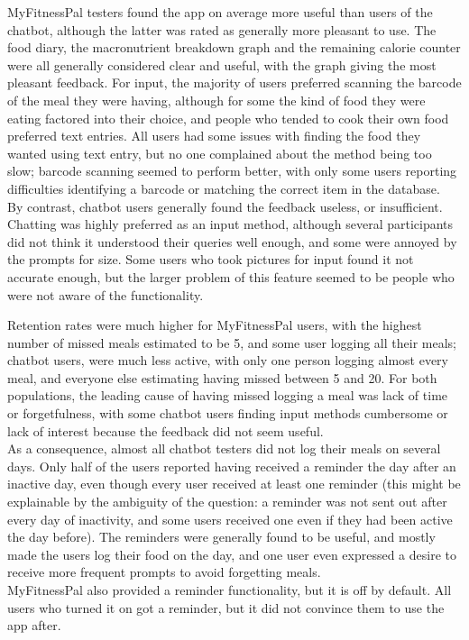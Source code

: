 MyFitnessPal testers found the app on average more useful than users of the chatbot, although the latter was rated as generally more pleasant to use. The food diary, the macronutrient breakdown graph and the remaining calorie counter were all generally considered clear and useful, with the graph giving the most pleasant feedback. For input, the majority of users preferred scanning the barcode of the meal they were having, although for some the kind of food they were eating factored into their choice, and people who tended to cook their own food preferred text entries. All users had some issues with finding the food they wanted using text entry, but no one complained about the method being too slow; barcode scanning seemed to perform better, with only some users reporting difficulties identifying a barcode or matching the correct item in the database. \\
By contrast, chatbot users generally found the feedback useless, or insufficient. Chatting was highly preferred as an input method, although several participants did not think it understood their queries well enough, and some were annoyed by the prompts for size. Some users who took pictures for input found it not accurate enough, but the larger problem of this feature seemed to be people who were not aware of the functionality.

Retention rates were much higher for MyFitnessPal users, with the highest number of missed meals estimated to be 5, and some user logging all their meals; chatbot users, were much less active, with only one person logging almost every meal, and everyone else estimating having missed between 5 and 20. For both populations, the leading cause of having missed logging a meal was lack of time or forgetfulness, with some chatbot users finding input methods cumbersome or lack of interest because the feedback did not seem useful. \\
As a consequence, almost all chatbot testers did not log their meals on several days. Only half of the users reported having received a reminder the day after an inactive day, even though every user received at least one reminder (this might be explainable by the ambiguity of the question: a reminder was not sent out after every day of inactivity, and some users received one even if they had been active the day before). The reminders were generally found to be useful, and mostly made the users log their food on the day, and one user even expressed a desire to receive more frequent prompts to avoid forgetting meals. \\
MyFitnessPal also provided a reminder functionality, but it is off by default. All users who turned it on got a reminder, but it did not convince them to use the app after. 

